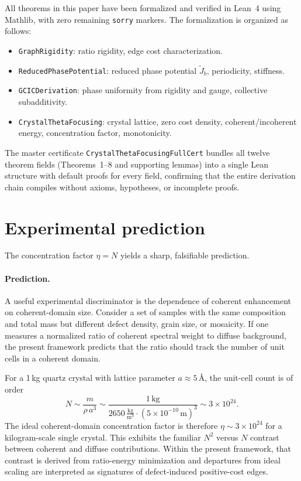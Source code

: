 \documentclass[prb,twocolumn,nofootinbib,superscriptaddress]{revtex4-2}
\newcommand{\J}{J}
\newcommand{\lean}[1]{\texttt{\small #1}}
\begin{document}
All theorems in this paper have been formalized and verified in Lean~4 using Mathlib, with zero remaining \texttt{sorry} markers.
The formalization is organized as follows:

\begin{itemize}
\item \lean{GraphRigidity}: ratio rigidity, edge cost characterization.
\item \lean{ReducedPhasePotential}: reduced phase potential $\widetilde{\J}_b$, periodicity, stiffness.
\item \lean{GCICDerivation}: phase uniformity from rigidity and gauge, collective subadditivity.
\item \lean{CrystalThetaFocusing}: crystal lattice, zero cost density, coherent/incoherent energy, concentration factor, monotonicity.
\end{itemize}

The master certificate \lean{CrystalThetaFocusingFullCert} bundles all twelve theorem fields (Theorems~1--8 and supporting lemmas) into a single Lean structure with default proofs for every field, confirming that the entire derivation chain compiles without axioms, hypotheses, or incomplete proofs.

\section{Experimental prediction}
\label{sec:prediction}

The concentration factor $\eta = N$ yields a sharp, falsifiable prediction.

\paragraph{Prediction.}
A useful experimental discriminator is the dependence of coherent enhancement on coherent-domain size.
Consider a set of samples with the same composition and total mass but different defect density, grain size, or mosaicity.
If one measures a normalized ratio of coherent spectral weight to diffuse background, the present framework predicts that the ratio should track the number of unit cells in a coherent domain.

For a 1\,kg quartz crystal with lattice parameter $a \approx 5$\,\AA, the unit-cell count is of order
\begin{equation}
N \sim \frac{m}{\rho\, a^3}
  \sim \frac{1\,\text{kg}}{2650\,\frac{\text{kg}}{\text{m}^3}
       \cdot (5{\times}10^{-10}\,\text{m})^3}
  \sim 3 \times 10^{24}.
\end{equation}
The ideal coherent-domain concentration factor is therefore $\eta \sim 3 \times 10^{24}$ for a kilogram-scale single crystal.
This exhibits the familiar $N^2$ versus $N$ contrast between coherent and diffuse contributions.
Within the present framework, that contrast is derived from ratio-energy minimization and departures from ideal scaling are interpreted as signatures of defect-induced positive-cost edges.
\end{document}
